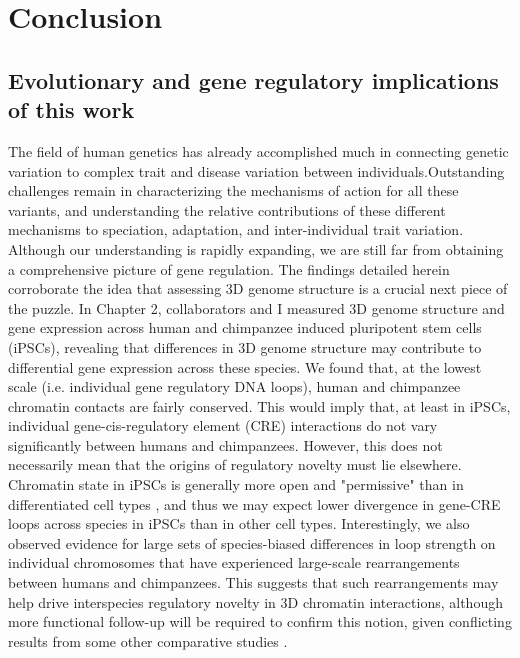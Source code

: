 \chapter{Conclusion}\label{ch:ch04}

\section{Evolutionary and gene regulatory implications of this work}
The field of human genetics has already accomplished much in connecting genetic variation to complex trait and disease variation between individuals.Outstanding challenges remain in characterizing the mechanisms of action for all these variants, and understanding the relative contributions of these different mechanisms to speciation, adaptation, and inter-individual trait variation. Although our understanding is rapidly expanding, we are still far from obtaining a comprehensive picture of gene regulation. The findings detailed herein corroborate the idea that assessing 3D genome structure is a crucial next piece of the puzzle. In Chapter 2, collaborators and I measured 3D genome structure and gene expression across human and chimpanzee induced pluripotent stem cells (iPSCs), revealing that differences in 3D genome structure may contribute to differential gene expression across these species. We found that, at the lowest scale (i.e. individual gene regulatory DNA loops), human and chimpanzee chromatin contacts are fairly conserved. This would imply that, at least in iPSCs, individual gene-cis-regulatory element (CRE) interactions do not vary significantly between humans and chimpanzees. However, this does not necessarily mean that the origins of regulatory novelty must lie elsewhere. Chromatin state in iPSCs is generally more open and "permissive" than in differentiated cell types \cite{Spivakov.2007}, and thus we may expect lower divergence in gene-CRE loops across species in iPSCs than in other cell types. Interestingly, we also observed evidence for large sets of species-biased differences in loop strength on individual chromosomes that have experienced large-scale rearrangements between humans and chimpanzees. This suggests that such rearrangements may help drive interspecies regulatory novelty in 3D chromatin interactions, although more functional follow-up will be required to confirm this notion, given conflicting results from some other comparative studies \cite{Lazar.2018, Krefting.2018}.

